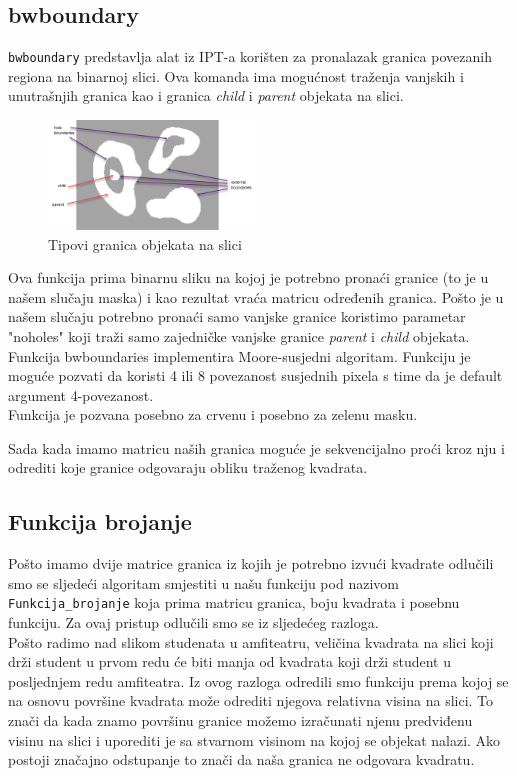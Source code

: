 \documentclass[a4paper,12pt]{article}
\begin{document}
\subsection{bwboundary}

\texttt{bwboundary} predstavlja alat iz IPT-a korišten za pronalazak granica povezanih regiona na binarnoj slici.
Ova komanda ima mogućnost traženja vanjskih i unutrašnjih granica kao i granica \textit {child} i  \textit{parent} objekata na slici.

\begin{figure}[htbp]
    \centering
    \includegraphics[width=0.49\textwidth]{bwboundaries.png}
    \caption{Tipovi granica objekata na slici}
    \label{fig:redMaskgreenMask}
\end{figure}


Ova funkcija prima binarnu sliku na kojoj je potrebno pronaći granice (to je u našem slučaju maska) i kao rezultat vraća matricu određenih granica. 
Pošto je u našem slučaju potrebno pronaći samo vanjske granice koristimo parametar "noholes"  koji traži samo zajedničke vanjske granice \textit{parent} i \textit{child} objekata.
Funkcija bwboundaries implementira Moore-susjedni algoritam. Funkciju je moguće pozvati da koristi 4 ili 8 povezanost susjednih pixela s time da je default argument 4-povezanost.
\\
Funkcija je pozvana posebno za crvenu i posebno za zelenu masku.

Sada kada imamo matricu naših granica moguće je sekvencijalno proći kroz nju i odrediti koje granice odgovaraju obliku traženog kvadrata.

\subsection{Funkcija brojanje}



Pošto imamo dvije matrice granica iz kojih je potrebno izvući kvadrate odlučili smo se sljedeći algoritam smjestiti u našu funkciju pod nazivom \texttt{Funkcija\_brojanje} koja prima matricu granica,  boju kvadrata i posebnu funkciju.
Za ovaj pristup odlučili smo se iz sljedećeg razloga.\\
Pošto radimo nad slikom studenata u amfiteatru, veličina kvadrata na slici koji drži student u prvom redu će biti manja od kvadrata koji drži student u posljednjem redu amfiteatra. 
Iz ovog razloga odredili smo funkciju prema kojoj se na osnovu površine kvadrata može odrediti njegova relativna visina na slici. To znači da kada znamo površinu granice možemo izračunati njenu predviđenu visinu na slici i uporediti je sa stvarnom visinom na kojoj se objekat nalazi. 
Ako postoji značajno odstupanje to znači da naša granica ne odgovara kvadratu.
\\
\end{document}
